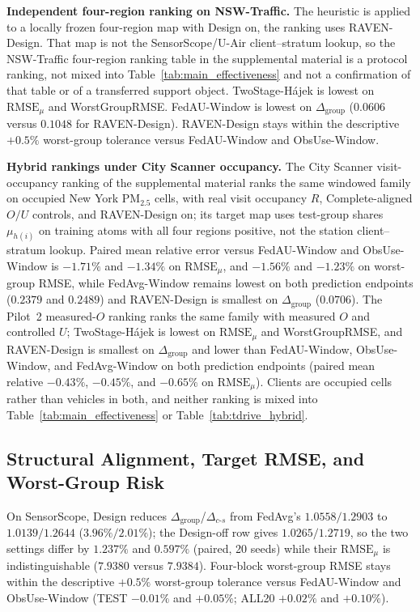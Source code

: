 \documentclass[letterpaper,journal]{IEEEtran}
\begin{document}
\noindent\textbf{Independent four-region ranking on NSW-Traffic.}
The heuristic is applied to a locally frozen four-region map
with Design on, the ranking uses RAVEN-Design.
That map is not the SensorScope/U-Air client--stratum lookup, so
the NSW-Traffic four-region ranking table in the supplemental material is a
protocol ranking, not mixed into Table~\ref{tab:main_effectiveness} and not a
confirmation of that table or of a transferred support object.
TwoStage-H\'ajek is lowest on $\mathrm{RMSE}_{\mu}$ and WorstGroupRMSE.
FedAU-Window is lowest on $\Delta_{\mathrm{group}}$ ($0.0606$ versus
$0.1048$ for RAVEN-Design).  RAVEN-Design
stays within the descriptive $+0.5\%$ worst-group tolerance versus
FedAU-Window and ObsUse-Window.

\noindent\textbf{Hybrid rankings under City Scanner occupancy.}
The City Scanner visit-occupancy ranking of the supplemental material ranks the
same windowed family on occupied New York {PM}$_{2.5}$ cells, with real visit
occupancy $R$, Complete-aligned $O/U$ controls, and RAVEN-Design on; its target
map uses test-group shares $\mu_{h(i)}$ on training atoms with all four regions
positive, not the station client--stratum lookup.  Paired mean relative error
versus FedAU-Window and ObsUse-Window is $-1.71\%$ and $-1.34\%$ on
$\mathrm{RMSE}_{\mu}$, and $-1.56\%$ and $-1.23\%$ on worst-group RMSE, while
FedAvg-Window remains lowest on both prediction endpoints ($0.2379$ and
$0.2489$) and RAVEN-Design is smallest on $\Delta_{\mathrm{group}}$ ($0.0706$).
The Pilot~2 measured-$O$ ranking ranks the same family with measured $O$ and
controlled $U$; TwoStage-H\'ajek is lowest on $\mathrm{RMSE}_{\mu}$ and
WorstGroupRMSE, and RAVEN-Design is smallest on $\Delta_{\mathrm{group}}$ and
lower than FedAU-Window, ObsUse-Window, and FedAvg-Window on both prediction
endpoints (paired mean relative $-0.43\%$, $-0.45\%$, and $-0.65\%$ on
$\mathrm{RMSE}_{\mu}$).  Clients are occupied cells rather than vehicles in both,
and neither ranking is mixed into Table~\ref{tab:main_effectiveness} or
Table~\ref{tab:tdrive_hybrid}.

\subsection{Structural Alignment, Target RMSE, and Worst-Group Risk}
\label{subsec:eval_rq2}

On SensorScope, Design reduces
$\Delta_{\mathrm{group}}$/$\Delta_{c\text{-}s}$ from FedAvg's $1.0558/1.2903$ to
$1.0139/1.2644$ ($3.96\%/2.01\%$); the Design-off row gives $1.0265/1.2719$, so
the two settings differ by $1.237\%$ and $0.597\%$ (paired, 20 seeds) while
their $\mathrm{RMSE}_{\mu}$ is indistinguishable ($7.9380$ versus $7.9384$).
Four-block worst-group RMSE stays within the descriptive $+0.5\%$ worst-group
tolerance versus FedAU-Window and
ObsUse-Window (TEST $-0.01\%$ and $+0.05\%$; ALL20 $+0.02\%$ and $+0.10\%$).
\end{document}
